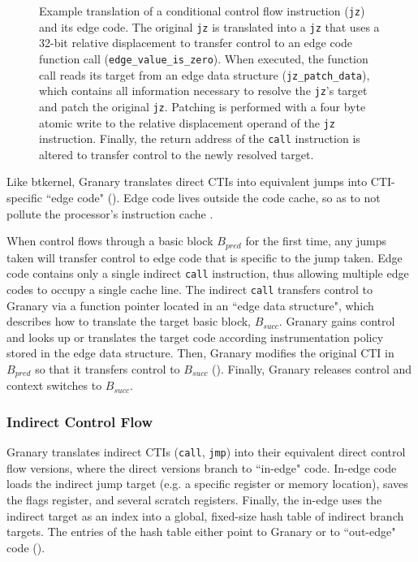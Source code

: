 \documentclass[preprint]{sigplanconf}
\begin{document}
\begin{figure}[t!]
\hfill
{}
\caption{\label{fig:direct_edge_code}Example translation of a conditional control flow instruction (\texttt{jz}) and its edge code. The original \texttt{jz} is translated into a \texttt{jz} that uses a 32-bit relative displacement to transfer control to an edge code function call (\texttt{edge\_value\_is\_zero}). When executed, the function call reads its target from an edge data structure (\texttt{jz\_patch\_data}), which contains all information necessary to resolve the \texttt{jz}'s target and patch the original \texttt{jz}. Patching is performed with a four byte atomic write to the relative displacement operand of the \texttt{jz} instruction. Finally, the return address of the \texttt{call} instruction is altered to transfer control to the newly resolved target.}
\end{figure}
Like btkernel, Granary translates direct CTIs into equivalent jumps into CTI-specific ``edge code" (). Edge code lives outside the code cache, so as to not pollute the processor's instruction cache \cite{btkernel}.

When control flows through a basic block $B_{pred}$ for the first time, any jumps taken will transfer control to edge code that is specific to the jump taken. Edge code contains only a single indirect \texttt{call} instruction, thus allowing multiple edge codes to occupy a single cache line. The indirect \texttt{call} transfers control to Granary via a function pointer located in an ``edge data structure", which describes how to translate the target basic block, $B_{succ}$. Granary gains control and looks up or translates the target code according instrumentation policy stored in the edge data structure. Then, Granary modifies the original CTI in $B_{pred}$ so that it transfers control to $B_{succ}$  (). Finally, Granary releases control and context switches to $B_{succ}$.

\subsubsection{Indirect Control Flow}\label{sec:ibl}

Granary translates indirect CTIs (\texttt{call}, \texttt{jmp}) into their equivalent direct control flow versions, where the direct versions branch to ``in-edge" code. In-edge code loads the indirect jump target (e.g. a specific register or memory location), saves the flags register, and several scratch registers. Finally, the in-edge uses the indirect target as an index into a global, fixed-size hash table of indirect branch targets. The entries of the hash table either point to Granary or to ``out-edge" code (). 
\end{document}
